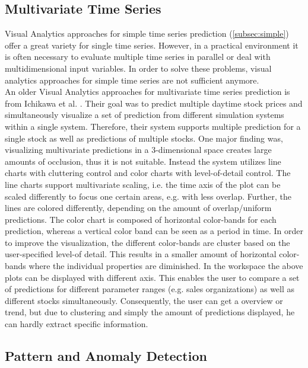 \documentclass[electronic]{vgtc}             %
\begin{document}
\subsection{Multivariate Time Series \label{subsec:multivar}}
Visual Analytics approaches for simple time series prediction (\autoref{subsec:simple}) offer a great variety for single time series.
However, in a practical environment it is often necessary to evaluate multiple time series in parallel or deal with multidimensional input variables.
In order to solve these problems, visual analytics approaches for simple time series are not sufficient anymore.\\ 
An older Visual Analytics approaches for multivariate time series prediction is from Ichikawa et al. \cite{ichikawa:2002}.
Their goal was to predict multiple daytime stock prices and simultaneously visualize a set of prediction from different simulation systems within a single system. 
Therefore, their system supports multiple prediction for a single stock as well as predictions of multiple stocks. 
One major finding was, visualizing multivariate predictions in a 3-dimensional space creates large amounts of occlusion, thus it is not suitable.
Instead the system utilizes line charts with cluttering control and color charts with level-of-detail control. 
The line charts support multivariate scaling, i.e. the time axis of the plot can be scaled differently to focus one certain areas, e.g. with less overlap.
Further, the lines are colored differently, depending on the amount of overlap/uniform predictions.
The color chart is composed of horizontal color-bands for each prediction, whereas a vertical color band can be seen as a period in time. 
In order to improve the visualization, the different color-bands are cluster based on the user-specified level-of detail. 
This results in a smaller amount of horizontal color-bands where the individual properties are diminished. 
In the workspace the above plots can be displayed with different axis.
This enables the user to compare a set of predictions for different parameter ranges (e.g. sales organizations) as well as different stocks simultaneously.
Consequently, the user can get a overview or trend, but due to clustering and simply the amount of predictions displayed, he can hardly extract specific information.\\


\subsection{Pattern and Anomaly Detection\label{subsec:pattern}}
\end{document}
